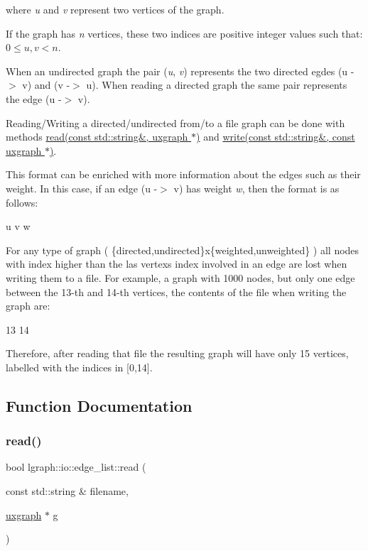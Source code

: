 where {\itshape u} and {\itshape v} represent two vertices of the graph.

If the graph has {\itshape n} vertices, these two indices are positive integer values such that\+: $0 \le u,v < n$.

When an undirected graph the pair ({\itshape u}, {\itshape v}) represents the two directed egdes (u -\/$>$ v) and (v -\/$>$ u). When reading a directed graph the same pair represents the edge (u -\/$>$ v).

Reading/\+Writing a directed/undirected from/to a file graph can be done with methods \hyperlink{namespacelgraph_1_1io_1_1edge__list_a51d3431a6910ab3120f2d12efb7c2073}{read(const std\+::string\&, uxgraph $\ast$)} and \hyperlink{namespacelgraph_1_1io_1_1edge__list_a769bbfbae588e800a54d5920ebf6f4d0}{write(const std\+::string\&, const uxgraph $\ast$)}.

This format can be enriched with more information about the edges such as their weight. In this case, if an edge (u -\/$>$ v) has weight {\itshape w}, then the format is as follows\+: \begin{DoxyVerb}u v w
\end{DoxyVerb}


For any type of graph ( \{directed,undirected\}x\{weighted,unweighted\} ) all nodes with index higher than the las vertex\textquotesingle{}s index involved in an edge are lost when writing them to a file. For example, a graph with 1000 nodes, but only one edge between the 13-\/th and 14-\/th vertices, the contents of the file when writing the graph are\+: \begin{DoxyVerb}13 14
\end{DoxyVerb}


Therefore, after reading that file the resulting graph will have only 15 vertices, labelled with the indices in \mbox{[}0,14\mbox{]}. 

\subsection{Function Documentation}
\mbox{\label{namespacelgraph_1_1io_1_1edge__list_a51d3431a6910ab3120f2d12efb7c2073}} 
\subsubsection{\texorpdfstring{read()}{read()}\hspace{0.1cm}{\footnotesize\ttfamily [1/4]}}
{\footnotesize\ttfamily bool lgraph\+::io\+::edge\+\_\+list\+::read (\begin{DoxyParamCaption}\item[{const std\+::string \&}]{filename,  }\item[{\hyperlink{classlgraph_1_1uxgraph}{uxgraph} $\ast$}]{g }\end{DoxyParamCaption})}



